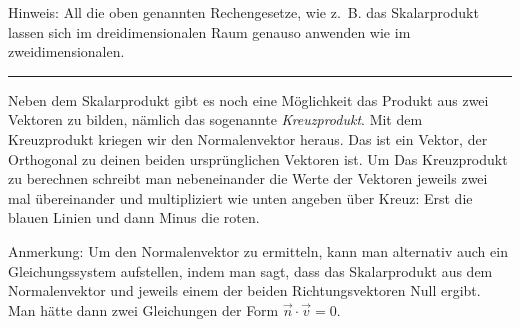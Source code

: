 \documentclass[12pt]{article}
\begin{document}
			Hinweis: All die oben genannten Rechengesetze, wie z.~B. das Skalarprodukt lassen sich im dreidimensionalen Raum genauso anwenden wie im zweidimensionalen.
			\vspace{.5cm}\hrule\vspace{.7cm}
			\noindent Neben dem Skalarprodukt gibt es noch eine Möglichkeit das Produkt aus zwei Vektoren zu bilden, nämlich das sogenannte \textit{Kreuzprodukt}. Mit dem Kreuzprodukt kriegen wir den Normalenvektor heraus. Das ist ein Vektor, der Orthogonal zu deinen beiden ursprünglichen Vektoren ist. Um Das Kreuzprodukt zu berechnen schreibt man nebeneinander die Werte der Vektoren jeweils zwei mal übereinander und multipliziert wie unten angeben über Kreuz: Erst die blauen Linien und dann Minus die roten.
			\begin{center}
			\end{center}
			Anmerkung: Um den Normalenvektor zu ermitteln, kann man alternativ auch ein Gleichungssystem aufstellen, indem man sagt, dass das Skalarprodukt aus dem Normalenvektor und jeweils einem der beiden Richtungsvektoren Null ergibt. Man hätte dann zwei Gleichungen der Form $\vec{n}\cdot\vec{v}=0$.
\end{document}
